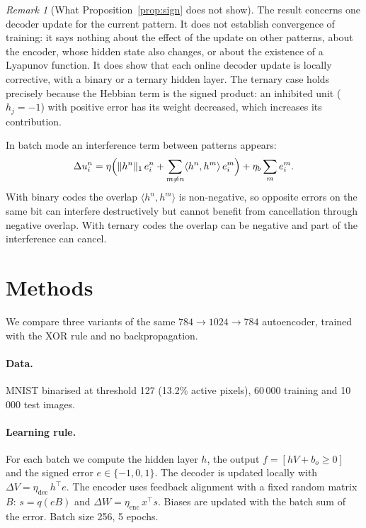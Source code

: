 \documentclass[11pt,a4paper]{article}
\theoremstyle{remark}
\newtheorem{remark}{Remark}
\begin{document}
\begin{remark}[What Proposition~\ref{prop:sign} does not show]
The result concerns one decoder update for the current pattern. It does not establish convergence of training: it says nothing about the effect of the update on other patterns, about the encoder, whose hidden state also changes, or about the existence of a Lyapunov function. It does show that each online decoder update is locally corrective, with a binary or a ternary hidden layer. The ternary case holds precisely because the Hebbian term is the signed product: an inhibited unit ($h_j=-1$) with positive error has its weight decreased, which increases its contribution.
\end{remark}

In batch mode an interference term between patterns appears:
\[
\Delta u_i^{n}=\eta\Bigl(\lVert h^{n}\rVert_1\,e_i^{n}+\sum_{m\ne n}\langle h^{n},h^{m}\rangle\,e_i^{m}\Bigr)+\eta_b\sum_m e_i^{m}.
\]
With binary codes the overlap $\langle h^n,h^m\rangle$ is non-negative, so opposite errors on the same bit can interfere destructively but cannot benefit from cancellation through negative overlap. With ternary codes the overlap can be negative and part of the interference can cancel.

\section{Methods}\label{sec:methods}

We compare three variants of the same $784\to1024\to784$ autoencoder, trained with the XOR rule and no backpropagation.

\paragraph{Data.} MNIST binarised at threshold 127 (13.2\% active pixels), 60\,000 training and 10\,000 test images.

\paragraph{Learning rule.} For each batch we compute the hidden layer $h$, the output $f=[hV+b_o\ge0]$ and the signed error $e\in\{-1,0,1\}$. The decoder is updated locally with $\Delta V=\eta_{\mathrm{dec}}\,h^\top e$. The encoder uses feedback alignment with a fixed random matrix $B$: $s=q(eB)$ and $\Delta W=\eta_{\mathrm{enc}}\,x^\top s$. Biases are updated with the batch sum of the error. Batch size 256, 5 epochs.
\end{document}
